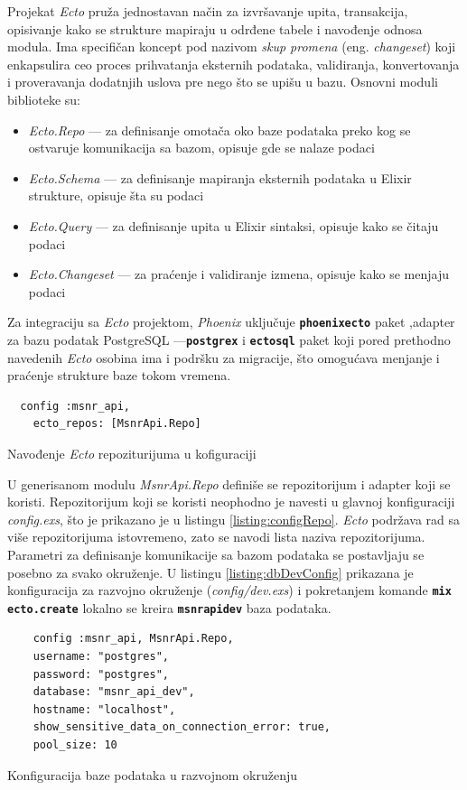 \documentclass[12pt,oneside]{memoir}
\begin{document}
Projekat \emph{Ecto} pruža jednostavan način za izvršavanje upita, transakcija, opisivanje kako se strukture mapiraju
u odrđene tabele i navođenje odnosa modula. Ima specifičan koncept pod nazivom \emph{skup promena} (eng. \emph{changeset}) koji enkapsulira ceo
proces prihvatanja eksternih podataka, validiranja, konvertovanja i proveravanja dodatnjih uslova pre nego što se upišu u bazu. Osnovni moduli biblioteke su:
\begin{itemize}
  \item \emph{Ecto.Repo} --- za definisanje omotača oko baze podataka preko kog se ostvaruje komunikacija sa bazom, opisuje gde se nalaze podaci
  \item \emph{Ecto.Schema} --- za definisanje mapiranja eksternih podataka u Elixir strukture, opisuje šta su podaci
  \item \emph{Ecto.Query} --- za definisanje upita u Elixir sintaksi, opisuje kako se čitaju podaci
  \item \emph{Ecto.Changeset} --- za praćenje i validiranje izmena, opisuje kako se menjaju podaci
\end{itemize}
Za integraciju sa \emph{Ecto} projektom, \emph{Phoenix} uključuje \texttt{\textbf{phoenix{\textunderscore}ecto}} paket
,adapter za bazu podatak PostgreSQL ---\texttt{\textbf{postgrex}} i \texttt{\textbf{ecto{\textunderscore}sql}} paket
koji pored prethodno navedenih \emph{Ecto} osobina ima i podršku za migracije, što omogućava menjanje i praćenje strukture
baze tokom vremena.
\begin{listing}[!h]
  \begin{verbatim}
  config :msnr_api,
    ecto_repos: [MsnrApi.Repo]
\end{verbatim}
\caption{Navođenje \emph{Ecto} repoziturijuma u kofiguraciji}
\label{listing:configRepo}
\end{listing}
U generisanom modulu \emph{MsnrApi.Repo} definiše se repozitorijum i adapter koji se koristi. Repozitorijum koji se koristi neophodno je navesti u
glavnoj konfiguraciji \emph{config.exs}, što je prikazano je u listingu \ref{listing:configRepo}. \emph{Ecto} podržava rad sa više repozitorijuma istovremeno, 
zato se navodi lista naziva repozitorijuma. Parametri za definisanje komunikacije sa bazom podataka se postavljaju se posebno za svako okruženje.
U listingu \ref{listing:dbDevConfig} prikazana je konfiguracija za razvojno okruženje (\emph{config/dev.exs}) i pokretanjem komande
\texttt{\textbf{mix ecto.create}} lokalno se kreira \texttt{\textbf{msnr{\textunderscore}api{\textunderscore}dev}} baza podataka. 
\begin{listing}[!h]
  \begin{verbatim}
    config :msnr_api, MsnrApi.Repo,
    username: "postgres",
    password: "postgres",
    database: "msnr_api_dev",
    hostname: "localhost",
    show_sensitive_data_on_connection_error: true,
    pool_size: 10
\end{verbatim}
\caption{Konfiguracija baze podataka u razvojnom okruženju}
\label{listing:dbDevConfig}
\end{listing}
\end{document}
